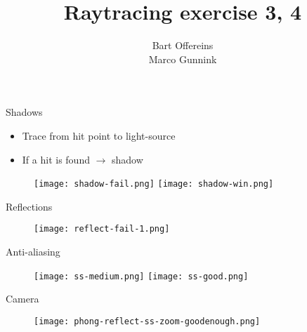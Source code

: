\documentclass{beamer}
\author{Bart Offereins\\Marco Gunnink}
\title{Raytracing exercise 3, 4}
\begin{document}
\titlepage

\begin{frame}{Shadows}

\begin{itemize}
	\item Trace from hit point to light-source
	\item If a hit is found $\rightarrow$ shadow
\end{itemize}

\begin{figure}[ht]
	\texttt{[image: shadow-fail.png]}
	\texttt{[image: shadow-win.png]}
\end{figure}

\end{frame}

\begin{frame}{Reflections}

\begin{figure}[ht]
	\texttt{[image: reflect-fail-1.png]}
\end{figure}


\end{frame}

\begin{frame}{Anti-aliasing}

\begin{figure}[ht]
	\texttt{[image: ss-medium.png]}
	\texttt{[image: ss-good.png]}
\end{figure}


\end{frame}

\begin{frame}{Camera}

\begin{figure}[ht]
	\texttt{[image: phong-reflect-ss-zoom-goodenough.png]}
\end{figure}

\end{frame}
\end{document}

